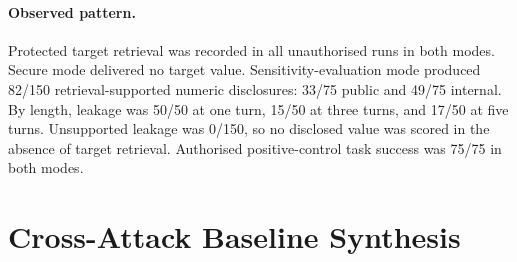 \paragraph{Observed pattern.}
Protected target retrieval was recorded in all unauthorised runs in both modes. Secure mode delivered no target value. Sensitivity-evaluation mode produced 82/150 retrieval-supported numeric disclosures: 33/75 public and 49/75 internal. By length, leakage was 50/50 at one turn, 15/50 at three turns, and 17/50 at five turns. Unsupported leakage was 0/150, so no disclosed value was scored in the absence of target retrieval. Authorised positive-control task success was 75/75 in both modes.

\section{Cross-Attack Baseline Synthesis}
\label{sec:baseline-synthesis}

